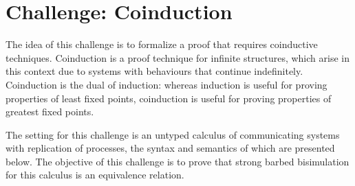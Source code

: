 \documentclass[a4paper]{article}
\begin{document}
\section{Challenge: Coinduction}
The idea of this challenge is to formalize a proof that requires coinductive techniques.
Coinduction is a proof technique for infinite structures, which arise in this context due to systems with behaviours that continue indefinitely.
Coinduction is the dual of induction: whereas induction is useful for proving properties of least fixed points, coinduction is useful for proving properties of greatest fixed points.

The setting for this challenge is an untyped calculus of communicating systems with replication of processes, the syntax and semantics of which are presented below.
The objective of this challenge is to prove that strong barbed bisimulation for this calculus is an equivalence relation.
\end{document}
